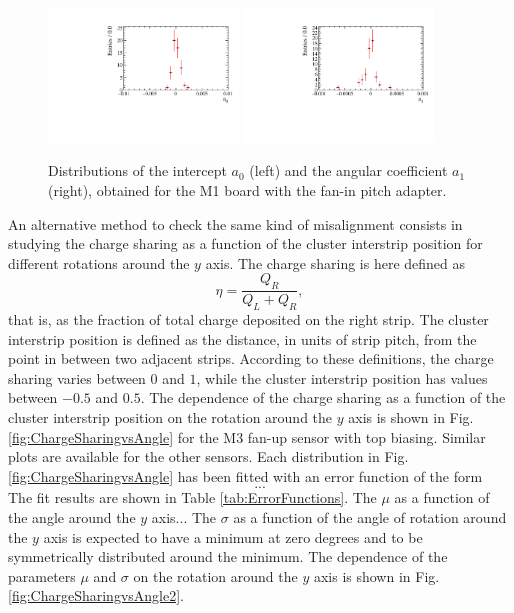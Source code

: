 \begin{figure}[]
\centering
\includegraphics[width=0.45\textwidth]{figs/CheckZRot/ca0_M1_FanIn.pdf}
\includegraphics[width=0.45\textwidth]{figs/CheckZRot/ca1_M1_FanIn.pdf}
\caption[Distributions of the intercept $a_0$ and the angular coefficient $a_1$.]{Distributions of the intercept $a_0$ (left) and the angular coefficient $a_1$ (right), obtained for the M1 board with the fan-in pitch adapter.}
\label{fig:CheckZRot}
\end{figure}

An alternative method to check the same kind of misalignment consists in studying the charge sharing as a function of the cluster interstrip position for different rotations around the $y$ axis. The charge sharing is here defined as
\begin{displaymath}
\eta = \frac{Q_R}{Q_L+Q_R},
\end{displaymath}
that is, as the fraction of total charge deposited on the right strip.
The cluster interstrip position is defined as the distance, in units of strip pitch, from the point in between two adjacent strips.
According to these definitions, the charge sharing varies between $0$ and $1$, while the cluster interstrip position has values between $-0.5$ and $0.5$.
The dependence of the charge sharing as a function of the cluster interstrip position on the rotation around the $y$ axis is shown in Fig. \ref{fig:ChargeSharingvsAngle} for the M3 fan-up sensor with top biasing. Similar plots are available for the other sensors.
Each distribution in Fig. \ref{fig:ChargeSharingvsAngle} has been fitted with an error function of the form
\begin{displaymath}
...
\end{displaymath}
The fit results are shown in Table \ref{tab:ErrorFunctions}.
The $\mu$ as a function of the angle around the $y$ axis...
The $\sigma$ as a function of the angle of rotation around the $y$ axis is expected to have a minimum at zero degrees and to be symmetrically distributed around the minimum.
The dependence of the parameters $\mu$ and $\sigma$ on the rotation around the $y$ axis is shown in Fig. \ref{fig:ChargeSharingvsAngle2}.

